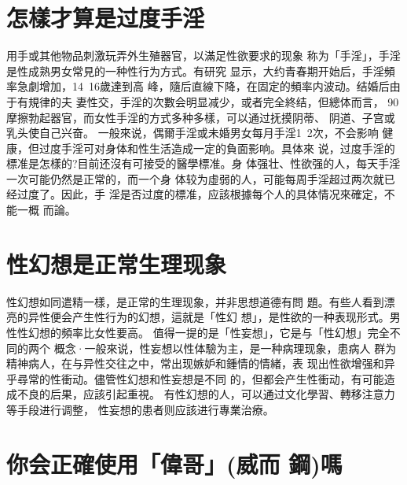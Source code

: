 \documentclass[12pt,UTF8]{ctexbook}
\begin{document}
\section{怎樣才算是过度手淫}

用手或其他物品刺激玩弄外生殖器官，以滿足性欲要求的现象
称为「手淫」，手淫是性成熟男女常見的一种性行为方式。有研究
显示，大约青春期开始后，手淫頻率急劇增加，14~16歲達到高
峰，隨后直線下降，在固定的頻率内波动。结婚后由于有規律的夫
妻性交，手淫的次數会明显减少，或者完全終结，但總体而言，
90%
摩擦勃起器官，而女性手淫的方式多种多樣，可以通过抚摸阴蒂、
阴道、子宫或乳头使自己兴奋。
一般來说，偶爾手淫或未婚男女每月手淫1~2次，不会影响
健康，但过度手淫可对身体和性生活造成一定的負面影响。具体來
说，过度手淫的標准是怎樣的?目前还沒有可接受的醫學標准。身
体强壮、性欲强的人，每天手淫一次可能仍然是正常的，而一个身
体较为虛弱的人，可能每周手淫超过两次就已经过度了。因此，手
淫是否过度的標准，应該根據每个人的具体情况來確定，不能一概
而論。
\section{性幻想是正常生理现象}
性幻想如同遣精一樣，是正常的生理现象，并非思想道德有問
題。有些人看到漂亮的异性便会产生性行为的幻想，這就是「性幻
想」，是性欲的一种表现形式。男性性幻想的頻率比女性要高。
值得一提的是「性妄想」，它是与「性幻想」完全不同的两个
概念·一般來说，性妄想以性体驗为主，是一种病理现象，患病人
群为精神病人，在与异性交往之中，常出现嫉妒和鍾情的情緒，表
现出性欲增强和异乎尋常的性衝动。儘管性幻想和性妄想是不同
的，但都会产生性衝动，有可能造成不良的后果，应該引起重視。
有性幻想的人，可以通过文化學習、轉移注意力等手段进行调整，
性妄想的患者则应該进行專業治療。

\section{你会正確使用「偉哥」(威而
鋼)嗎}
\end{document}
